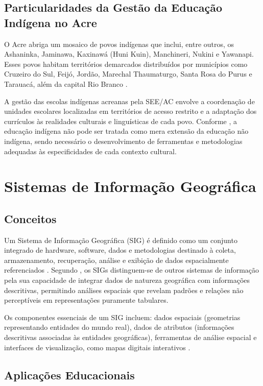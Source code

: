 \documentclass[12pt,a4paper,oneside]{abntspiifac}
\begin{document}
\subsection{Particularidades da Gestão da Educação Indígena no Acre}

O Acre abriga um mosaico de povos indígenas que inclui, entre outros, os Ashaninka, Jaminawa, Kaxinawá (Huni Kuin), Manchineri, Nukini e Yawanapi. Esses povos habitam territórios demarcados distribuídos por municípios como Cruzeiro do Sul, Feijó, Jordão, Marechal Thaumaturgo, Santa Rosa do Purus e Tarauacá, além da capital Rio Branco \cite{secretariaacre2022}.

A gestão das escolas indígenas acreanas pela SEE/AC envolve a coordenação de unidades escolares localizadas em territórios de acesso restrito e a adaptação dos currículos às realidades culturais e linguísticas de cada povo. Conforme , a educação indígena não pode ser tratada como mera extensão da educação não indígena, sendo necessário o desenvolvimento de ferramentas e metodologias adequadas às especificidades de cada contexto cultural.

\section{Sistemas de Informação Geográfica}

\subsection{Conceitos}

Um Sistema de Informação Geográfica (SIG) é definido como um conjunto integrado de hardware, software, dados e metodologias destinado à coleta, armazenamento, recuperação, análise e exibição de dados espacialmente referenciados \cite{longley2013}. Segundo , os SIGs distinguem-se de outros sistemas de informação pela sua capacidade de integrar dados de natureza geográfica com informações descritivas, permitindo análises espaciais que revelam padrões e relações não perceptíveis em representações puramente tabulares.

Os componentes essenciais de um SIG incluem: dados espaciais (geometrias representando entidades do mundo real), dados de atributos (informações descritivas associadas às entidades geográficas), ferramentas de análise espacial e interfaces de visualização, como mapas digitais interativos \cite{longley2013}.

\subsection{Aplicações Educacionais}
\end{document}
